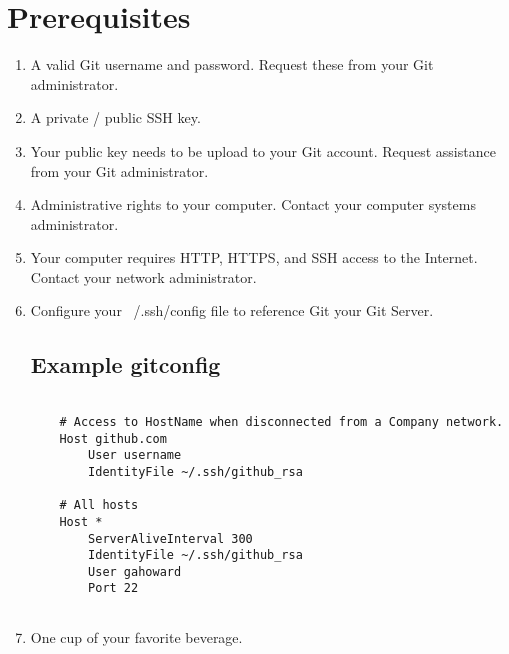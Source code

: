 \section{Prerequisites}
\begin{enumerate}
\item
A valid Git username and password.  Request these from your Git administrator.

\item A private / public SSH key.

\item Your public key needs to be upload to your Git account.  Request
  assistance from your Git administrator.

\item Administrative rights to your computer.  Contact your computer systems
  administrator.

\item Your computer requires HTTP, HTTPS, and SSH access to the Internet.
  Contact your network administrator.

\item Configure your ~/.ssh/config file to reference Git your Git Server.

\subsection{Example gitconfig}
\begin{verbatim}

    # Access to HostName when disconnected from a Company network.
    Host github.com 
        User username
        IdentityFile ~/.ssh/github_rsa

    # All hosts
    Host *
        ServerAliveInterval 300
        IdentityFile ~/.ssh/github_rsa
        User gahoward
        Port 22
        
\end{verbatim}

\item
One cup of your favorite beverage.
\end{enumerate}
